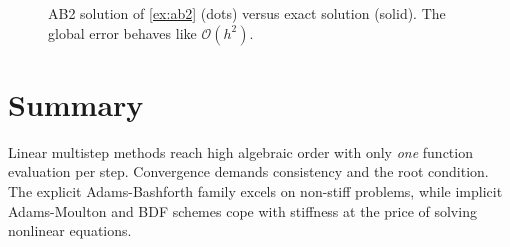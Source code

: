 \begin{figure}[htbp]
  \centering
  
  \caption{AB2 solution of \ref{ex:ab2} (dots) versus exact solution (solid). The global error behaves like $\mathcal{O}(h^2)$.}
  \label{fig:ab2-example}
\end{figure}

\section*{Summary}
Linear multistep methods reach high algebraic order with only \emph{one} function evaluation per step.
Convergence demands consistency and the root condition.
The explicit Adams-Bashforth family excels on non-stiff problems, while implicit Adams-Moulton and BDF schemes cope with stiffness at the price of solving nonlinear equations.



